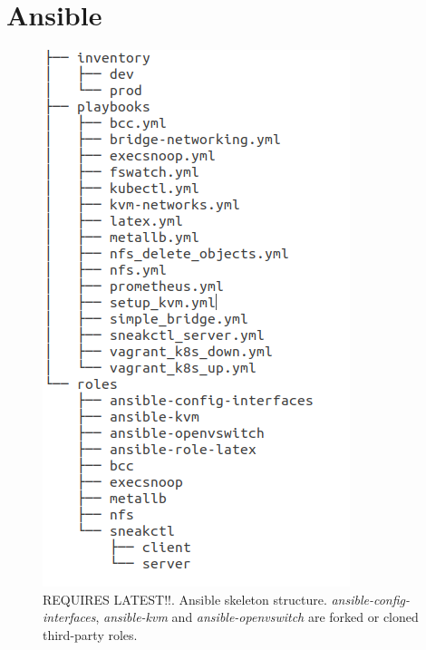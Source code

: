 \setcounter{figure}{0}
\setcounter{listing}{0}

\chapter{Ansible \label{appendix:ansible}}

\begin{figure}[h]
	\centering
	\includegraphics[scale=0.5]{assets/appendices/ansible_tree}
	\caption{REQUIRES LATEST!!. Ansible skeleton structure. \textit{ansible-config-interfaces}, \textit{ansible-kvm} and \textit{ansible-openvswitch} are forked or cloned third-party roles.}
	\label{appendix:ansible:structure}
\end{figure}

